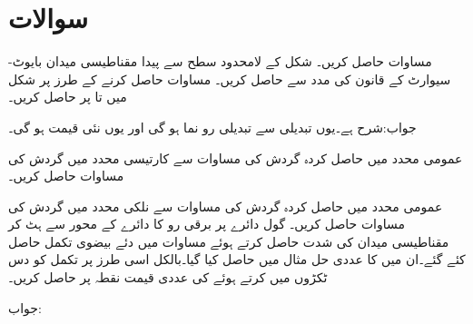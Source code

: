 \section*{سوالات}

مساوات  حاصل کریں۔
شکل  کے لامحدود سطح سے پیدا مقناطیسی میدان بایوٹ-سیوارٹ کے قانون کی مدد سے حاصل کریں۔
مساوات  حاصل کرنے کے طرز پر شکل  میں  تا  پر  حاصل کریں۔

جواب:شرح  ہے۔یوں  تبدیلی سے   تبدیلی رو نما ہو گی اور یوں نئی قیمت 
{} ہو گی۔

عمومی محدد میں حاصل کردہ گردش کی مساوات سے کارتیسی محدد میں گردش کی مساوات حاصل کریں۔

عمومی محدد میں حاصل کردہ گردش کی مساوات سے نلکی محدد میں گردش کی مساوات حاصل کریں۔
گول دائرے پر برقی رو کا دائرے کے محور سے ہٹ کر مقناطیسی میدان کی شدت حاصل کرتے ہوئے مساوات  میں دئے بیضوی تکمل حاصل کئے گئے۔ان میں  کا عددی حل مثال  میں حاصل کیا گیا۔بالکل اسی طرز پر تکمل کو دس ٹکڑوں میں کرتے ہوئے   کی عددی قیمت نقطہ  پر حاصل کریں۔

جواب:


